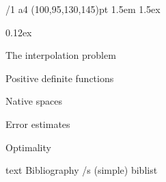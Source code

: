 \useOpTeX  %



\hyperlinks \Black \Black
{}

\enlang
\fontfam[EBGaramond]

\margins/1 a4 (100,95,130,145)pt
\typosize[12.21/14.5]
\parindent 1.5em
\parskip 1.5ex

 0.12ex


\tocpage


\sec The interpolation problem


\sec Positive definite functions


\sec Native spaces


\sec Error estimates


\sec Optimality










\let\_mtext\ignoreit
\nonum\chap Bibliography
\def\_opwarning#1{}
\usebib/s (simple) biblist


\bye